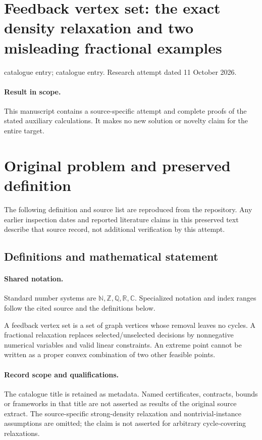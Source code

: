 \documentclass[11pt]{article}
\begin{document}
\section*{Feedback vertex set: the exact density relaxation and two misleading fractional examples}
\noindent catalogue entry; catalogue entry. Research attempt dated 11 October 2026.
\paragraph{Result in scope.}This manuscript contains a source-specific attempt and complete proofs of the stated auxiliary calculations. It makes no new solution or novelty claim for the entire target.
\section{Original problem and preserved definition}
The following definition and source list are reproduced from the repository. Any earlier inspection dates and reported literature claims in this preserved text describe that source record, not additional verification by this attempt.
\subsection{Definitions and mathematical statement}

\paragraph{Shared notation.}Standard number systems are $\mathbb N,\mathbb Z,\mathbb Q,\mathbb R,\mathbb C$. Specialized notation and index ranges follow the cited source and the definitions below.


A feedback vertex set is a set of graph vertices whose removal leaves no cycles. A fractional relaxation replaces selected/unselected decisions by nonnegative numerical variables and valid linear constraints. An extreme point cannot be written as a proper convex combination of two other feasible points.
\paragraph{Record scope and qualifications.}
The catalogue title is retained as metadata. Named certificates, contracts, bounds or frameworks in that title are not asserted as results of the original source extract.
The source-specific strong-density relaxation and nontrivial-instance assumptions are omitted; the claim is not asserted for arbitrary cycle-covering relaxations.
\end{document}
